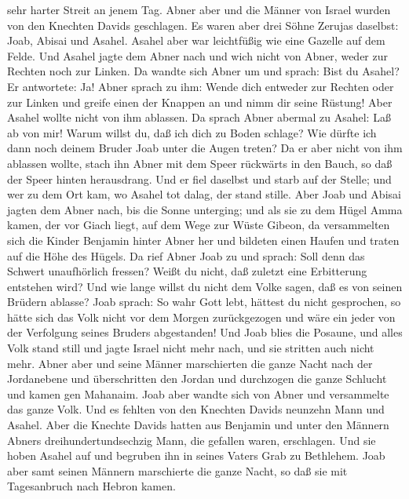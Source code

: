 sehr harter Streit an jenem Tag. Abner aber und die Männer von Israel
wurden von den Knechten Davids geschlagen.  Es waren aber
drei Söhne Zerujas daselbst: Joab, Abisai und Asahel. Asahel aber war
leichtfüßig wie eine Gazelle auf dem Felde.  Und Asahel
jagte dem Abner nach und wich nicht von Abner, weder zur Rechten noch
zur Linken.  Da wandte sich Abner um und sprach: Bist du
Asahel? Er antwortete: Ja!  Abner sprach zu ihm: Wende
dich entweder zur Rechten oder zur Linken und greife einen der Knappen
an und nimm dir seine Rüstung! Aber Asahel wollte nicht von ihm
ablassen.  Da sprach Abner abermal zu Asahel: Laß ab von
mir! Warum willst du, daß ich dich zu Boden schlage? Wie dürfte ich dann
noch deinem Bruder Joab unter die Augen treten?  Da er
aber nicht von ihm ablassen wollte, stach ihn Abner mit dem Speer
rückwärts in den Bauch, so daß der Speer hinten herausdrang. Und er fiel
daselbst und starb auf der Stelle; und wer zu dem Ort kam, wo Asahel tot
dalag, der stand stille.  Aber Joab und Abisai jagten dem
Abner nach, bis die Sonne unterging; und als sie zu dem Hügel Amma
kamen, der vor Giach liegt, auf dem Wege zur Wüste Gibeon,
 da versammelten sich die Kinder Benjamin hinter Abner
her und bildeten einen Haufen und traten auf die Höhe des Hügels.
 Da rief Abner Joab zu und sprach: Soll denn das Schwert
unaufhörlich fressen? Weißt du nicht, daß zuletzt eine Erbitterung
entstehen wird? Und wie lange willst du nicht dem Volke sagen, daß es
von seinen Brüdern ablasse?  Joab sprach: So wahr Gott
lebt, hättest du nicht gesprochen, so hätte sich das Volk nicht vor dem
Morgen zurückgezogen und wäre ein jeder von der Verfolgung seines
Bruders abgestanden!  Und Joab blies die Posaune, und
alles Volk stand still und jagte Israel nicht mehr nach, und sie
stritten auch nicht mehr.  Abner aber und seine Männer
marschierten die ganze Nacht nach der Jordanebene und überschritten den
Jordan und durchzogen die ganze Schlucht und kamen gen Mahanaim.
 Joab aber wandte sich von Abner und versammelte das
ganze Volk. Und es fehlten von den Knechten Davids neunzehn Mann und
Asahel.  Aber die Knechte Davids hatten aus Benjamin und
unter den Männern Abners dreihundertundsechzig Mann, die gefallen waren,
erschlagen.  Und sie hoben Asahel auf und begruben ihn in
seines Vaters Grab zu Bethlehem. Joab aber samt seinen Männern
marschierte die ganze Nacht, so daß sie mit Tagesanbruch nach Hebron
kamen.

